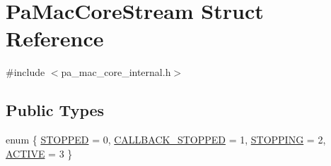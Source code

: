 \hypertarget{struct_pa_mac_core_stream}{}\section{Pa\+Mac\+Core\+Stream Struct Reference}
\label{struct_pa_mac_core_stream}


{\ttfamily \#include $<$pa\+\_\+mac\+\_\+core\+\_\+internal.\+h$>$}

\subsection*{Public Types}
\begin{DoxyCompactItemize}
\item 
enum \{ \hyperlink{struct_pa_mac_core_stream_a30713dfebf18cf11bdee902e316d9673a2db0c1fbc59ffd1ce39420043567034f}{S\+T\+O\+P\+P\+ED} = 0, 
\hyperlink{struct_pa_mac_core_stream_a30713dfebf18cf11bdee902e316d9673a9ccbe914a7f2cda7757a109e259d707c}{C\+A\+L\+L\+B\+A\+C\+K\+\_\+\+S\+T\+O\+P\+P\+ED} = 1, 
\hyperlink{struct_pa_mac_core_stream_a30713dfebf18cf11bdee902e316d9673ad7a565d0dc9a0f8056f8c308daf07234}{S\+T\+O\+P\+P\+I\+NG} = 2, 
\hyperlink{struct_pa_mac_core_stream_a30713dfebf18cf11bdee902e316d9673ae9d399d5b7b458c6509601a9e4770c30}{A\+C\+T\+I\+VE} = 3
 \}
\end{DoxyCompactItemize}
